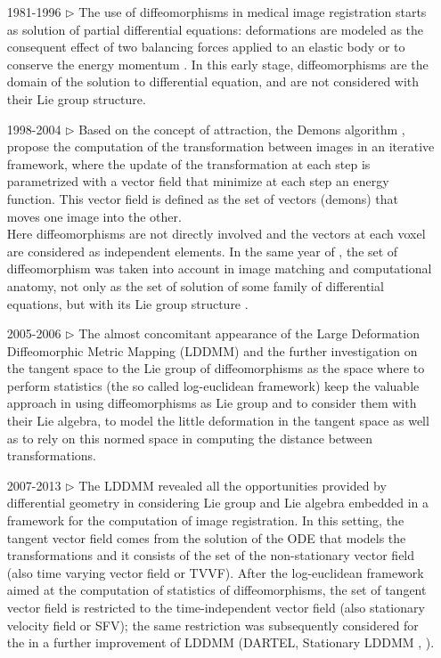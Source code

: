 \begin{enumerate}
	\item[1981-1996 $\triangleright$] The use of diffeomorphisms in medical image registration starts as solution of partial differential equations: deformations are modeled as the consequent effect of two balancing forces applied to an elastic body \cite{Broit:1981} or to conserve the energy momentum \cite{christensen1996deformable}. In this early stage, diffeomorphisms are the domain of the solution to differential equation, and are not considered with their Lie group structure.
	\item[1998-2004 $\triangleright$] Based on the concept of attraction, the Demons algorithm \cite{thirion1998image}, \cite{pennec1999understanding} propose the computation of the transformation between images in an iterative framework, where the update of the transformation at each step is parametrized with a vector field that minimize at each step an energy function. This vector field is defined as the set of vectors (demons) that moves one image into the other. \\
	Here diffeomorphisms are not directly involved and the vectors at each voxel are considered as independent elements. 
	In the same year of \cite{thirion1998image}, the set of diffeomorphism was taken into account in image matching and computational anatomy, not only as the set of solution of some family of differential equations, but with its Lie group structure \cite{Dupuis:98:variationalproblems,  trouve1998diffeomorphisms, grenander1998computational}.
	\item[2005-2006 $\triangleright$] The almost concomitant appearance of the Large Deformation Diffeomorphic Metric Mapping (LDDMM) \cite{beg2005computing} and the further investigation on the tangent space to the Lie group of diffeomorphisms as the space where to perform statistics (the so called log-euclidean framework) \cite{arsigny2006statistics, Arsigny:MRM:06} keep the valuable approach in using diffeomorphisms as Lie group and to consider them with their Lie algebra, to model the little deformation in the tangent space as well as to rely on this normed space in computing the distance between transformations.
	\item[2007-2013 $\triangleright$] The LDDMM revealed all the opportunities provided by differential geometry in considering Lie group and Lie algebra embedded in a framework for the computation of image registration. In this setting, the tangent vector field comes from the solution of the ODE that models the transformations and it consists of the set of the non-stationary vector field (also time varying vector field or TVVF). After the log-euclidean framework \cite{arsigny2006statistics} aimed at the computation of statistics of diffeomorphisms, the set of tangent vector field is restricted to the time-independent vector field (also stationary velocity field or SFV); the same restriction was subsequently considered for the in a further improvement of LDDMM (DARTEL, Stationary LDDMM \cite{Ashburner:07}, \cite{hernandez2007registration}). 

\end{enumerate}
